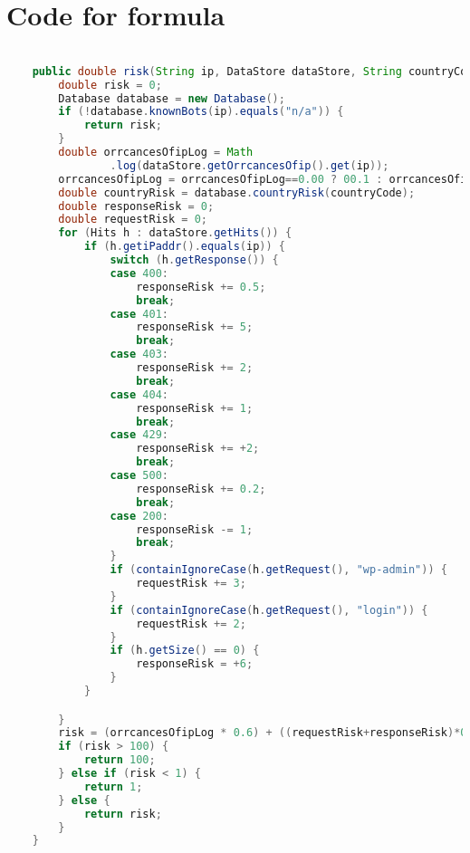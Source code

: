 \section{Code for formula}

\label{Formula code}
\begin{lstlisting}[language=Java, caption=Formula code] 

	public double risk(String ip, DataStore dataStore, String countryCode) {
		double risk = 0;
		Database database = new Database();
		if (!database.knownBots(ip).equals("n/a")) {
			return risk;
		}
		double orrcancesOfipLog = Math
				.log(dataStore.getOrrcancesOfip().get(ip));
		orrcancesOfipLog = orrcancesOfipLog==0.00 ? 00.1 : orrcancesOfipLog;
		double countryRisk = database.countryRisk(countryCode); 
		double responseRisk = 0;
		double requestRisk = 0;
		for (Hits h : dataStore.getHits()) {
			if (h.getiPaddr().equals(ip)) {
				switch (h.getResponse()) {
				case 400:
					responseRisk += 0.5;
					break;
				case 401:
					responseRisk += 5;
					break;
				case 403:
					responseRisk += 2;
					break;
				case 404:
					responseRisk += 1;
					break;
				case 429:
					responseRisk += +2;
					break;
				case 500:
					responseRisk += 0.2;
					break;
				case 200:
					responseRisk -= 1;
					break;
				}
				if (containIgnoreCase(h.getRequest(), "wp-admin")) {
					requestRisk += 3;
				}
				if (containIgnoreCase(h.getRequest(), "login")) {
					requestRisk += 2;
				}
				if (h.getSize() == 0) {
					responseRisk = +6;
				}
			}

		}
		risk = (orrcancesOfipLog * 0.6) + ((requestRisk+responseRisk)*0.3) + (countryRisk * 0.1);
		if (risk > 100) {
			return 100;
		} else if (risk < 1) {
			return 1;
		} else {
			return risk;
		}
	}
\end{lstlisting}
